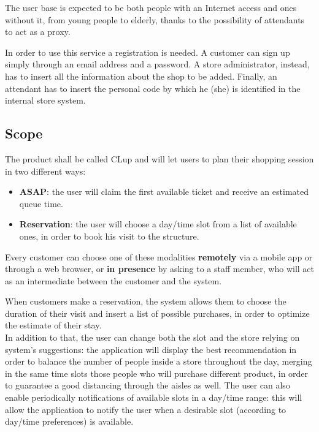 \documentclass[table, 12pt]{article}
\begin{document}
\begin{flushleft}
    The user base is expected to be both people with an Internet access and ones without it, from young people to elderly, thanks to the possibility of attendants to act as a proxy.

    In order to use this service a registration is needed. A customer can sign up simply through an email address and a password. A store administrator, instead, has to insert all the information about the shop to be added. Finally, an attendant has to insert the personal code by which he (she) is identified in the internal store system.

    \subsection{Scope}
    The product shall be called CLup and will let users to plan their shopping session in two different ways:
    \begin{itemize}
        \item {\textbf{ASAP}: the user will claim the first available ticket and receive an estimated queue time.}
        \item {\textbf{Reservation}: the user will choose a day/time slot from a list of available ones, in order to book his visit to the structure.}
    \end{itemize}

    Every customer can choose one of these modalities \textbf{remotely} via a mobile app or through a web browser, or \textbf{in presence} by asking to a staff member, who will act as an intermediate between the customer and the system.

    When customers make a reservation, the system allows them to choose the duration of their visit and insert a list of possible purchases, in order to optimize the estimate of their stay.\\

    In addition to that, the user can change both the slot and the store relying on system's suggestions: the application will display the best recommendation in order to balance the number of people inside a store throughout the day, merging in the same time slots those people who will purchase different product, in order to guarantee a good distancing through the aisles as well. The user can also enable periodically notifications of available slots in a day/time range: this will allow the application to notify the user when a desirable slot (according to day/time preferences) is available.



\end{flushleft}
\end{document}

